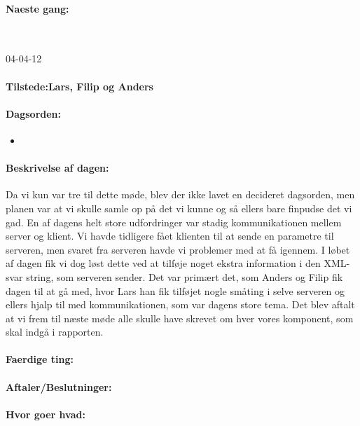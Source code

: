 \documentclass[a4paper,10pt,titlepage]{article}
\begin{document}
		\paragraph{Naeste gang:}\mbox{}\\
		
		\begin{center}
		04-04-12
		\end{center}
		
		\paragraph{Tilstede:Lars, Filip og Anders}
		\paragraph{Dagsorden:}
		\begin{itemize}
					\item 
					
		\end{itemize}
		
		\paragraph{Beskrivelse af dagen:}
		Da vi kun var tre til dette møde, blev der ikke lavet en decideret dagsorden, men planen var at vi skulle samle op på det vi kunne og så ellers bare finpudse det vi gad. En af dagens helt store udfordringer var stadig kommunikationen mellem server og klient. Vi havde tidligere fået klienten til at sende en parametre til serveren, men svaret fra serveren havde vi problemer med at få igennem. I løbet af dagen fik vi dog løst dette ved at tilføje noget ekstra information i den XML-svar string, som serveren sender. Det var primært det, som Anders og Filip fik dagen til at gå med, hvor Lars han fik tilføjet nogle småting i selve serveren og ellers hjalp til med kommunikationen, som var dagens store tema. Det blev aftalt at vi frem til næste møde alle skulle have skrevet om hver vores komponent, som skal indgå i rapporten. 
		\paragraph{Faerdige ting:}
		
		\paragraph{Aftaler/Beslutninger:}
		
		\paragraph{Hvor goer hvad:}
		
\end{document}
